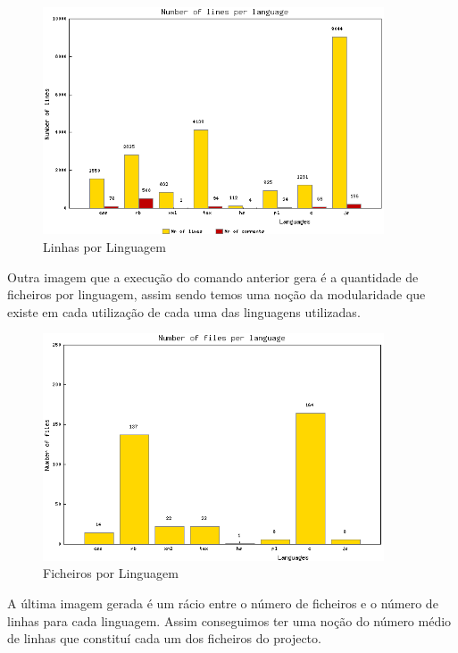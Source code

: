 \begin{figure}[htbp]
\begin{center}
\includegraphics[width=0.9\textwidth]{Images/projecto_LinesPerLanguage.png}
\caption{Linhas por Linguagem}\label{fig:linesperlanguage}
\end{center}
\end{figure}

Outra imagem que a execução do comando anterior gera é a quantidade de ficheiros por linguagem, assim sendo temos uma noção da modularidade que existe
em cada utilização de cada uma das linguagens utilizadas.

\begin{figure}[htbp]
\begin{center}
\includegraphics[width=0.9\textwidth]{Images/projecto_FilesPerLanguage.png}
\caption{Ficheiros por Linguagem}\label{fig:filesperlanguage}
\end{center}
\end{figure}

A última imagem gerada é um rácio entre o número de ficheiros e o número de linhas para cada linguagem. Assim conseguimos ter uma
noção do número médio de
linhas que constituí cada um dos ficheiros do projecto.

